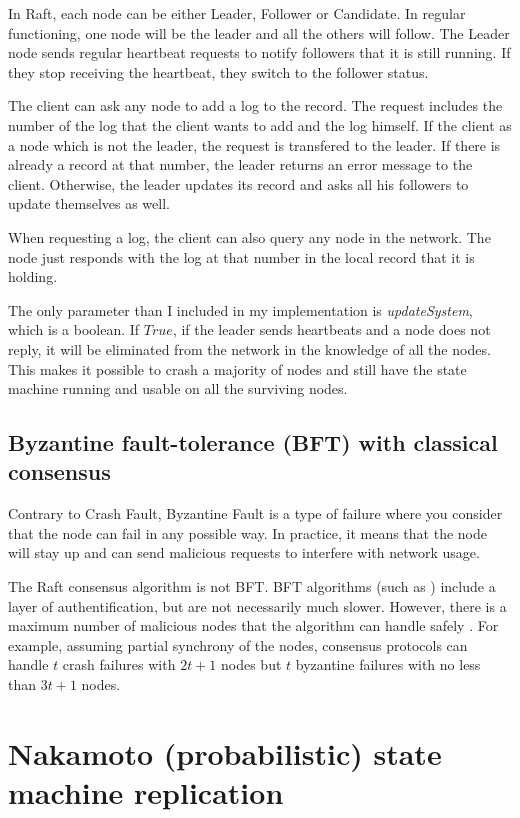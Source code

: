 \documentclass[11pt, twocolumn]{article}
\begin{document}
In Raft, each node can be either Leader, Follower or Candidate. In regular functioning, one node will be the leader and all the others will follow.
The Leader node sends regular heartbeat requests to notify followers that it is still running. If they stop receiving the heartbeat, they switch to the follower status.

The client can ask any node to add a log to the record.
The request includes the number of the log that the client wants to add and the log himself. If the client as a node which is not the leader, the request is transfered to the leader. If there is already a record at that number,
the leader returns an error message to the client. Otherwise, the leader updates its record and asks all his followers to update themselves as well.

When requesting a log, the client can also query any node in the network. The node just responds with the log at that number in the local record that it is holding.

The only parameter than I included in my implementation is \emph{updateSystem}, which is a boolean. If $True$, if the leader sends heartbeats and a node does not reply, 
it will be eliminated from the network in the knowledge of all the nodes. This makes it possible to
crash a majority of nodes and still have the state machine running and usable on all the surviving nodes. 

\subsection{Byzantine fault-tolerance (BFT) with classical consensus}

Contrary to Crash Fault, Byzantine Fault \cite{byzantine} is a type of failure where you consider that the node can fail in any possible way. In practice, it means that the node will stay up and can send malicious requests to
interfere with network usage.

The Raft consensus algorithm is not BFT. BFT algorithms (such as \cite{pbft}) include a layer of authentification, but are not necessarily much slower. However, there is a maximum number of malicious nodes that the algorithm can handle safely \cite{partialSynchrony}.
For example, assuming partial synchrony of the nodes, consensus protocols can handle $t$ crash failures with $2t+1$ nodes but $t$ byzantine failures with no less than $3t+1$ nodes.

\section{Nakamoto (probabilistic) state machine replication}
\end{document}
